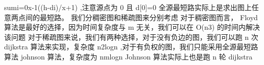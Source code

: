 \markdownRendererBackslash{}sum\markdownRendererUnderscore{}\markdownRendererLeftBrace{}i=0\markdownRendererRightBrace{}\markdownRendererCircumflex{}\markdownRendererLeftBrace{}x-1\markdownRendererRightBrace{}((h-d\markdownRendererUnderscore{}i)/x+1) \markdownRendererDollarSign{},注意源点为\markdownRendererDollarSign{} 0 \markdownRendererDollarSign{}且\markdownRendererDollarSign{} d[0]=0 \markdownRendererDollarSign{}\markdownRendererInterblockSeparator
{}
\markdownRendererSectionEnd 
\markdownRendererSectionEnd \markdownRendererSectionBegin
{}\markdownRendererInterblockSeparator
{}全源最短路实际上是求出图上任意两点间的最短路。\markdownRendererParagraphSeparator
{}我们分稠密图和稀疏图来分别考虑\markdownRendererParagraphSeparator
{}对于稠密图而言，\markdownRendererDollarSign{} Floyd\markdownRendererSoftLineBreak
{}\markdownRendererDollarSign{}算法是最好的选择，因为时间复杂度与\markdownRendererDollarSign{} m\markdownRendererSoftLineBreak
{}\markdownRendererDollarSign{}无关，我们可以在\markdownRendererDollarSign{} O(n\markdownRendererCircumflex{}3) \markdownRendererDollarSign{}的时间内解决该问题\markdownRendererParagraphSeparator
{}对于稀疏图来说，我们有两种选择，对于没有负边的图，我们可以跑\markdownRendererDollarSign{} n \markdownRendererDollarSign{}次\markdownRendererDollarSign{} dijkstra\markdownRendererSoftLineBreak
{}\markdownRendererDollarSign{}算法来实现，复杂度\markdownRendererDollarSign{} n\markdownRendererCircumflex{}2logn\markdownRendererSoftLineBreak
{}\markdownRendererDollarSign{},对于有负权的图，我们只能采用全源最短路算法\markdownRendererDollarSign{} johnson \markdownRendererDollarSign{}算法，复杂度为\markdownRendererDollarSign{} nmlogn \markdownRendererDollarSign{}\markdownRendererInterblockSeparator
{}\markdownRendererSectionBegin
{}\markdownRendererInterblockSeparator
{}\markdownRendererInterblockSeparator
{}
\markdownRendererSectionEnd \markdownRendererSectionBegin
{}\markdownRendererInterblockSeparator
{}\markdownRendererDollarSign{} Johnson\markdownRendererSoftLineBreak
{}\markdownRendererDollarSign{}算法实际上也是跑\markdownRendererDollarSign{} n\markdownRendererSoftLineBreak
{}\markdownRendererDollarSign{}轮\markdownRendererDollarSign{} dijkstra\markdownRendererSoftLineBreak
